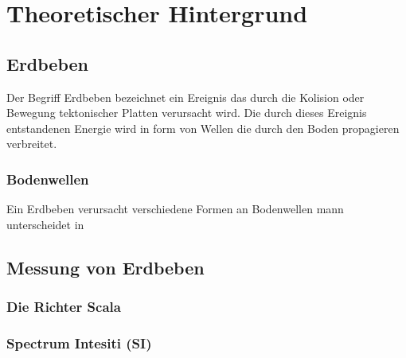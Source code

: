 \documentclass[class=scrbook, crop=false]{standalone}
\begin{document}
\ifstandalone

    
\fi

\chapter{Theoretischer Hintergrund}
\section{Erdbeben}
Der Begriff Erdbeben bezeichnet ein Ereignis das durch die Kolision oder Bewegung tektonischer Platten verursacht wird. Die durch dieses Ereignis entstandenen Energie wird in form von Wellen die durch den Boden propagieren verbreitet.
\subsection{Bodenwellen}
Ein Erdbeben verursacht verschiedene Formen an Bodenwellen mann unterscheidet in 

\section{Messung von Erdbeben}

\subsection{Die Richter Scala}

\subsection{Spectrum Intesiti (SI)}



\ifstandalone
    \printbibliography[heading=bibintoc]                         \cleardoublepage




\fi
\end{document}
